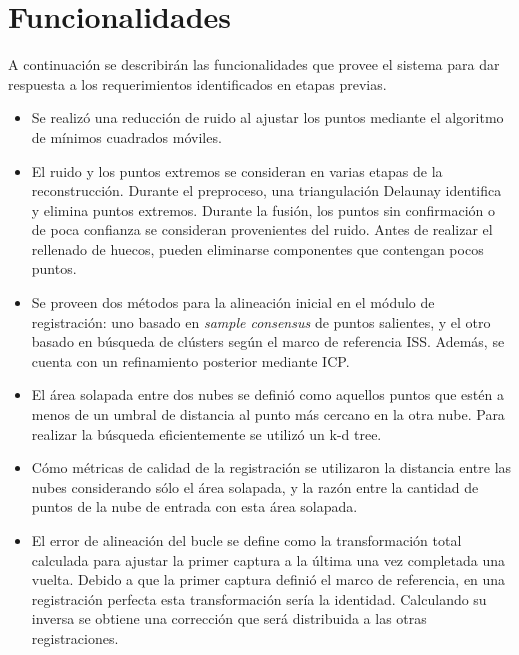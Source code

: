 	\section{Funcionalidades}
		A continuación se describirán las funcionalidades que provee el sistema
		para dar respuesta a los requerimientos identificados en etapas
		previas.

		\begin{itemize}
			\item  {}
				Se realizó una reducción de ruido al ajustar los puntos
				mediante el algoritmo de mínimos cuadrados móviles.

			\item  {}
				El ruido y los puntos extremos se consideran en varias etapas de la reconstrucción.
				Durante el preproceso, una triangulación Delaunay identifica y elimina puntos extremos.
				Durante la fusión, los puntos sin confirmación o de poca confianza
				se consideran provenientes del ruido.
				Antes de realizar el rellenado de huecos, pueden eliminarse
				componentes que contengan pocos puntos.

			\item  {}
				Se proveen dos métodos para la alineación inicial en el módulo de registración:
				uno basado en \emph{sample consensus} de puntos salientes, y el otro basado en
				búsqueda de clústers según el marco de referencia ISS.
				Además, se cuenta con un refinamiento posterior mediante ICP.

			\item  {}
				El área solapada  entre dos nubes
				se definió como aquellos puntos que estén a menos de un umbral de distancia
				al punto más cercano en la otra nube.
				Para realizar la búsqueda eficientemente se utilizó un k-d tree.

			\item  {}
				Cómo métricas de calidad de la registración se utilizaron
				la distancia entre las nubes considerando sólo el área solapada,
				y la razón entre la cantidad de puntos de la nube de entrada con esta área solapada.

			\item  {}
				El error de alineación del bucle se define como la
				transformación total calculada para ajustar la primer captura a la última
				una vez completada una vuelta. Debido a que la primer captura definió el
				marco de referencia, en una registración perfecta esta
				transformación sería la identidad.
				Calculando su inversa se obtiene una corrección que será distribuida
				a las otras registraciones.


\end{itemize}
